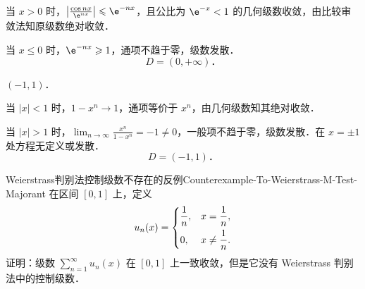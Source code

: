 \begin{solution}
    当 $x > 0$ 时，$\left|\frac{\cos nx}{\e^{nx}}\right| \leqslant \e^{-nx}$，且公比为 $\e^{-x} < 1$ 的几何级数收敛，由比较审敛法知原级数绝对收敛．

    当 $x \leqslant 0$ 时，$\e^{-nx} \geqslant 1$，通项不趋于零，级数发散．
    \begin{equation}
        \boxed{D = (0, +\infty)．}
    \end{equation}

     $(-1, 1)$．

    当 $|x| < 1$ 时，$1 - x^n \to 1$，通项等价于 $x^n$，由几何级数知其绝对收敛．

    当 $|x| > 1$ 时，$\lim_{n\to\infty} \frac{x^n}{1 - x^n} = -1 \neq 0$，一般项不趋于零，级数发散．在 $x = \pm 1$ 处方程无定义或发散．
    \begin{equation}
        \boxed{D = (-1, 1)．}
    \end{equation}
\end{solution}

\begin{problem}{Weierstrass判别法控制级数不存在的反例}{Counterexample-To-Weierstrass-M-Test-Majorant}
    在区间 $[0, 1]$ 上，定义
    \begin{equation}
        u_n(x) = \begin{dcases}
            \frac{1}{n}, & x = \frac{1}{n},    \\
            0,           & x \neq \frac{1}{n}.
        \end{dcases}
    \end{equation}
    证明：级数 $\sum_{n=1}^\infty u_n(x)$ 在 $[0, 1]$ 上一致收敛，但是它没有 Weierstrass 判别法中的控制级数．
\end{problem}

